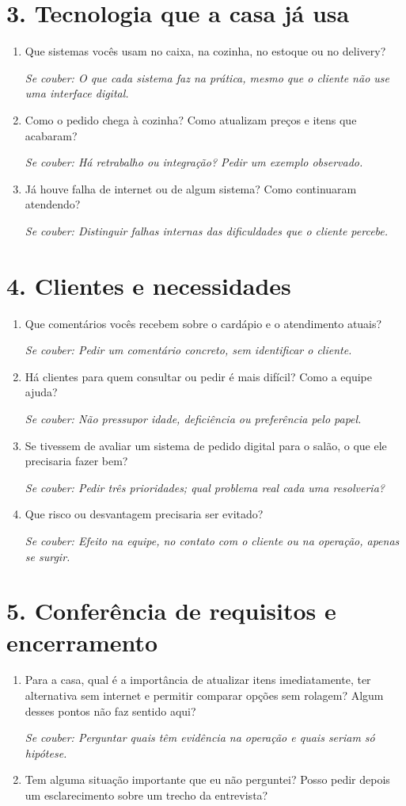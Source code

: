 \documentclass[11pt,a4paper]{article}
\newcommand{\aprofundar}[1]{\par{\small\color{gray}\textit{Se couber: #1}}}
\begin{document}
\section*{3. Tecnologia que a casa já usa}
\begin{enumerate}[resume]
  \item Que sistemas vocês usam no caixa, na cozinha, no estoque ou no delivery?
    \aprofundar{O que cada sistema faz na prática, mesmo que o cliente não use uma interface digital.}
  \item Como o pedido chega à cozinha? Como atualizam preços e itens que acabaram?
    \aprofundar{Há retrabalho ou integração? Pedir um exemplo observado.}
  \item Já houve falha de internet ou de algum sistema? Como continuaram atendendo?
    \aprofundar{Distinguir falhas internas das dificuldades que o cliente percebe.}
\end{enumerate}

\section*{4. Clientes e necessidades}
\begin{enumerate}[resume]
  \item Que comentários vocês recebem sobre o cardápio e o atendimento atuais?
    \aprofundar{Pedir um comentário concreto, sem identificar o cliente.}
  \item Há clientes para quem consultar ou pedir é mais difícil? Como a equipe ajuda?
    \aprofundar{Não pressupor idade, deficiência ou preferência pelo papel.}
  \item Se tivessem de avaliar um sistema de pedido digital para o salão, o que ele precisaria fazer bem?
    \aprofundar{Pedir três prioridades; qual problema real cada uma resolveria?}
  \item Que risco ou desvantagem precisaria ser evitado?
    \aprofundar{Efeito na equipe, no contato com o cliente ou na operação, apenas se surgir.}
\end{enumerate}

\section*{5. Conferência de requisitos e encerramento}
\begin{enumerate}[resume]
  \item Para a casa, qual é a importância de atualizar itens imediatamente, ter alternativa sem internet e permitir comparar opções sem rolagem? Algum desses pontos não faz sentido aqui?
    \aprofundar{Perguntar quais têm evidência na operação e quais seriam só hipótese.}
  \item Tem alguma situação importante que eu não perguntei? Posso pedir depois um esclarecimento sobre um trecho da entrevista?
\end{enumerate}
\end{document}
